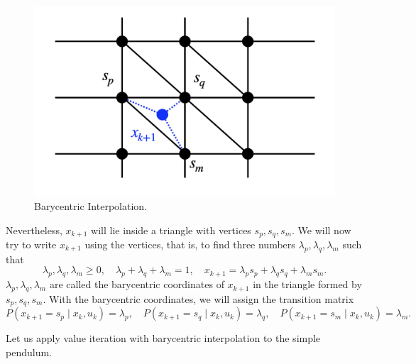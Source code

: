 \documentclass[
]{book}
\theoremstyle{definition}
\theoremstyle{definition}
\theoremstyle{definition}
\theoremstyle{definition}
\theoremstyle{remark}
\begin{document}
\begin{figure}

{\centering \includegraphics[width=0.5\linewidth]{images/barycentric-coordinate} 

}

\caption{Barycentric Interpolation.}\label{fig:barycentric-interpolation}
\end{figure}

Nevertheless, \(x_{k+1}\) will lie inside a triangle with vertices \(s_p, s_q, s_m\). We will now try to write \(x_{k+1}\) using the vertices, that is, to find three numbers \(\lambda_p, \lambda_q, \lambda_m\) such that
\[
\lambda_p, \lambda_q, \lambda_m \geq 0, \quad \lambda_p + \lambda_q + \lambda_m = 1, \quad x_{k+1} = \lambda_p s_p + \lambda_q s_q + \lambda_m s_m.
\]
\(\lambda_p,\lambda_q,\lambda_m\) are called the barycentric coordinates of \(x_{k+1}\) in the triangle formed by \(s_p,s_q,s_m\). With the barycentric coordinates, we will assign the transition matrix
\[
P(x_{k+1}=s_p \mid x_k,u_k) = \lambda_p, \quad P(x_{k+1}=s_q \mid x_k,u_k) = \lambda_q, \quad P(x_{k+1}=s_m \mid x_k,u_k) = \lambda_m.
\]

Let us apply value iteration with barycentric interpolation to the simple pendulum.
\end{document}

